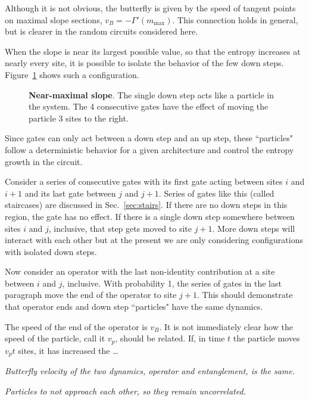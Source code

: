 Although it is not obvious, the butterfly is given by the speed of tangent points on maximal slope sections, $v_B = -\Gamma'(m_{\text{max}})$. This connection holds in general, but is clearer in the random circuits considered here.

When the slope is near its largest possible value, so that the entropy increases at nearly every site, it is possible to isolate the behavior of the few down steps. Figure~\ref{fig:particle} shows such a configuration.
\begin{figure}
	\centering
	
	\caption{\textbf{Near-maximal slope}. The single down step acts like a particle in the system. The 4 consecutive gates have the effect of moving the particle 3 sites to the right.}
	\label{fig:particle}
\end{figure}
Since gates can only act between a down step and an up step, these ``particles" follow a deterministic behavior for a given architecture and control the entropy growth in the circuit. 

Consider a series of consecutive gates with its first gate acting between sites $i$ and $i+1$ and its last gate between $j$ and $j+1$. Series of gates like this (called staircases) are discussed in Sec.~\ref{sec:stairs}. If there are no down steps in this region, the gate has no effect. If there is a single down step somewhere between sites $i$ and $j$, inclusive, that step gets moved to site $j+1$. More down steps will interact with each other but at the present we are only considering configurations with isolated down steps. 

Now consider an operator with the last non-identity contribution at a site between $i$ and $j$, inclusive. With probability 1, the series of gates in the last paragraph move the end of the operator to site $j+1$. This should demonstrate that operator ends and down step ``particles" have the same dynamics. 

The speed of the end of the operator is $v_B$. It is not immediately clear how the speed of the particle, call it $v_p$, should be related. If, in time $t$ the particle moves $v_pt$ sites, it has increased the \dots

\emph{Butterfly velocity of the two dynamics, operator and entanglement, is the same.}

\emph{Particles to not approach each other, so they remain uncorrelated.}